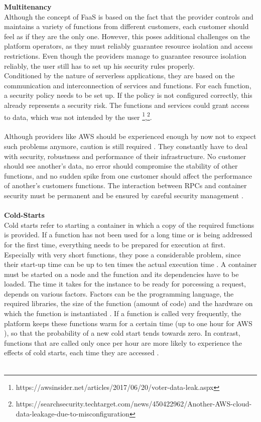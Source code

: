 \documentclass[11pt]{article}
\begin{document}
\textbf{Multitenancy}\\
Although the concept of FaaS is based on the fact that the provider controls and maintains a variety of functions from different customers, each customer should feel as if they are the only one. However, this poses additional challenges on the platform operators, as they must reliably guarantee resource isolation and access restrictions. Even though the providers manage to guarantee resource isolation reliably, the user still has to set up his security rules properly.\\ Conditioned by the nature of serverless applications, they are based on the communication and interconnection of services and functions. For each function, a security policy needs to be set up. If the policy is not configured correctly, this already represents a security risk. The functions and services could grant access to data, which was not intended by the user \footnote{https://awsinsider.net/articles/2017/06/20/voter-data-leak.aspx},\footnote{https://searchsecurity.techtarget.com/news/450422962/Another-AWS-cloud-data-leakage-due-to-misconfiguration}.\\\\
Although providers like AWS should be experienced enough by now not to expect such problems anymore, caution is still required \cite{fowler2018serverless}. They constantly have to deal with security, robustness and performance of their infrastructure. No customer should see another's data, no error should compromise the stability of other functions, and no sudden spike from one customer should affect the performance of another's customers functions. The interaction between RPCs and container security must be permanent and be ensured by careful security management \cite{mcgrath2017serverless}.\\\\
\textbf{Cold-Starts}\\
Cold starts refer to starting a container in which a copy of the required functions is provided. If a function has not been used for a long time or is being addressed for the first time, everything needs to be prepared for execution at first. Especially with very short functions, they pose a considerable problem, since their start-up time can be up to ten times the actual execution time \cite{shahrad2019architectural}. A container must be started on a node and the function and its dependencies have to be loaded. The time it takes for the instance to be ready for porcessing a request, depends on various factors. Factors can be the programming language, the required libraries, the size of the function (amount of code) and the hardware on which the function is instantiated \cite{shafiei2020serverless} \cite{jonas2019cloud}. If a function is called very frequently, the platform keeps these functions \glqq warm\grqq{} for a certain time (up to one hour for AWS \cite{roberts2017serverless}), so that the probability of a new cold start tends towards zero. In contrast, functions that are called only once per hour are more likely to experience the effects of cold starts, each time they are accessed \cite{roberts2017serverless}. \\\\
\end{document}
